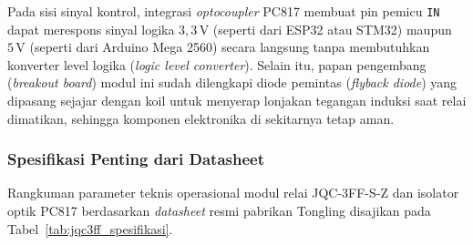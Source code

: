 Pada sisi sinyal kontrol, integrasi \textit{optocoupler} PC817 membuat pin pemicu \texttt{IN} dapat merespons sinyal logika $3{,}3\,\text{V}$ (seperti dari ESP32 atau STM32) maupun $5\,\text{V}$ (seperti dari Arduino Mega 2560) secara langsung tanpa membutuhkan konverter level logika (\textit{logic level converter}). Selain itu, papan pengembang (\textit{breakout board}) modul ini sudah dilengkapi diode pemintas (\textit{flyback diode}) yang dipasang sejajar dengan koil untuk menyerap lonjakan tegangan induksi saat relai dimatikan, sehingga komponen elektronika di sekitarnya tetap aman.

\subsubsection{Spesifikasi Penting dari Datasheet}
Rangkuman parameter teknis operasional modul relai JQC-3FF-S-Z dan isolator optik PC817 berdasarkan \textit{datasheet} resmi pabrikan Tongling disajikan pada Tabel~\ref{tab:jqc3ff_spesifikasi}.


